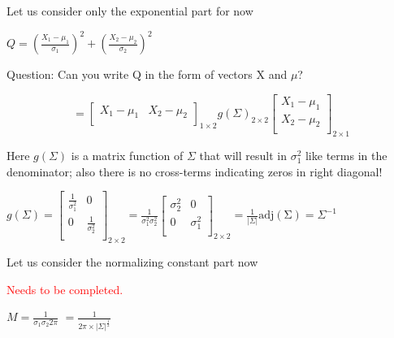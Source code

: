\documentclass{beamer}
\begin{document}
\begin{frame}

Let us consider only the exponential part for now

$ Q =  \left(\frac{X_1-\mu_1}{\sigma_1}\right)^2 + \left(\frac{X_2-\mu_2}{\sigma_2}\right)^2 $

Question: Can you write Q in the form of vectors X and $\mu$?

$$
 = \begin{bmatrix}
	X_1 - \mu_1 &
	X_2 - \mu_2 \\
\end{bmatrix}_{1\times2}  g(\Sigma)_{2\times2} \begin{bmatrix}
X_1 - \mu_1 \\
X_2 - \mu_2 \\
\end{bmatrix}_{2\times1}
$$

Here $g(\Sigma)$ is a matrix function of $\Sigma$ that will result in $\sigma_1^2$ like terms in the denominator; also there is no cross-terms indicating zeros in right diagonal!

$g(\Sigma) = \begin{bmatrix}
 \frac{1}{\sigma_1^2}& 0  \\
 0 &  \frac{1}{\sigma_2^2} \\
\end{bmatrix}_{2\times2} = \frac{1}{\sigma_1^2 \sigma_2^2}\begin{bmatrix}
{\sigma_2^2}& 0  \\
0 &  {\sigma_1^2}   \\ 
\end{bmatrix}_{2\times2} = \frac{1}{|\Sigma|} \operatorname{adj(\Sigma)} = \Sigma^{-1}$

\end{frame}


\begin{frame}
Let us consider the normalizing constant part now

\textcolor{red}{Needs to be completed.}

$M = \frac{1}{\sigma_1 \sigma_2 2\pi }$
$=\frac{1}{2\pi \times |\Sigma|^{\frac{1}{2}}}$
\end{frame}
\end{document}
